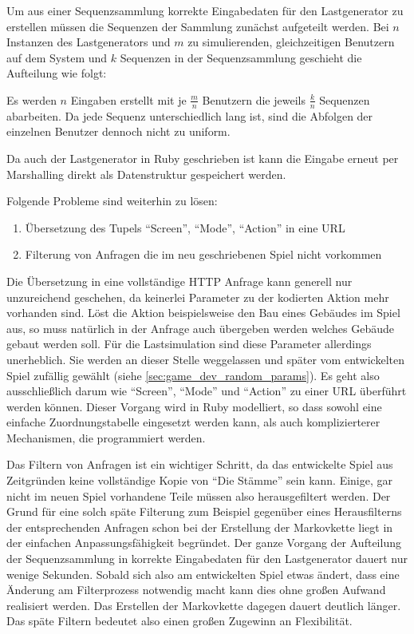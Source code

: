 \documentclass[10pt]{scrartcl}
\begin{document}
  Um aus einer Sequenzsammlung korrekte Eingabedaten für den Lastgenerator zu erstellen müssen die Sequenzen der Sammlung zunächst aufgeteilt werden. Bei $n$ Instanzen des Lastgenerators und $m$ zu simulierenden, gleichzeitigen Benutzern auf dem System und $k$ Sequenzen in der Sequenzsammlung geschieht die Aufteilung wie folgt:
  
  Es werden $n$ Eingaben erstellt mit je $\frac{m}{n}$ Benutzern die jeweils $\frac{k}{n}$ Sequenzen abarbeiten. Da jede Sequenz unterschiedlich lang ist, sind die Abfolgen der einzelnen Benutzer dennoch nicht zu uniform.
  
  Da auch der Lastgenerator in Ruby geschrieben ist kann die Eingabe erneut per Marshalling direkt als Datenstruktur gespeichert werden.
  
  Folgende Probleme sind weiterhin zu lösen:
  
  \begin{enumerate}
    \item Übersetzung des Tupels ``Screen'', ``Mode'', ``Action'' in eine URL
    \item Filterung von Anfragen die im neu geschriebenen Spiel nicht vorkommen
  \end{enumerate}
  
  Die Übersetzung in eine vollständige HTTP Anfrage kann generell nur unzureichend geschehen, da keinerlei Parameter zu der kodierten Aktion mehr vorhanden sind. Löst die Aktion beispielsweise den Bau eines Gebäudes im Spiel aus, so muss natürlich in der Anfrage auch übergeben werden welches Gebäude gebaut werden soll. Für die Lastsimulation sind diese Parameter allerdings unerheblich. Sie werden an dieser Stelle weggelassen und später vom entwickelten Spiel zufällig gewählt (siehe \ref{sec:game_dev_random_params}). Es geht also ausschließlich darum wie ``Screen'', ``Mode'' und ``Action'' zu einer URL überführt werden können. Dieser Vorgang wird in Ruby modelliert, so dass sowohl eine einfache Zuordnungstabelle eingesetzt werden kann, als auch komplizierterer Mechanismen, die programmiert werden.
  
  Das Filtern von Anfragen ist ein wichtiger Schritt, da das entwickelte Spiel aus Zeitgründen keine vollständige Kopie von ``Die Stämme'' sein kann. Einige, gar nicht im neuen Spiel vorhandene Teile müssen also herausgefiltert werden. Der Grund für eine solch späte Filterung zum Beispiel gegenüber eines Herausfilterns der entsprechenden Anfragen schon bei der Erstellung der Markovkette liegt in der einfachen Anpassungsfähigkeit begründet. Der ganze Vorgang der Aufteilung der Sequenzsammlung in korrekte Eingabedaten für den Lastgenerator dauert nur wenige Sekunden. Sobald sich also am entwickelten Spiel etwas ändert, dass eine Änderung am Filterprozess notwendig macht kann dies ohne großen Aufwand realisiert werden. Das Erstellen der Markovkette dagegen dauert deutlich länger. Das späte Filtern bedeutet also einen großen Zugewinn an Flexibilität.
  
\end{document}
